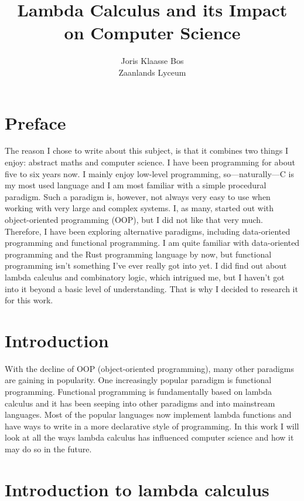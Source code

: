 \documentclass[11pt]{article}
\title{Lambda Calculus and its Impact on Computer Science}
\author{Joris Klaasse Bos\\ Zaanlands Lyceum}
\begin{document}
\maketitle
\newpage

\section*{Preface}


The reason I chose to write about this subject, is that it combines two things
I enjoy: abstract maths and computer science. I have been programming for about
five to six years now. I mainly enjoy low-level programming, so---naturally---C
is my most used language and I am most familiar with a simple procedural
paradigm. Such a paradigm is, however, not always very easy to use when working
with very large and complex systems. I, as many, started out with
object-oriented programming (OOP), but I did not like that very much.
Therefore, I have been exploring alternative paradigms, including data-oriented
programming and functional programming. I am quite familiar with data-oriented
programming and the Rust programming language by now, but functional
programming isn't something I've ever really got into yet. I did find out about
lambda calculus and combinatory logic, which intrigued me, but I haven’t got
into it beyond a basic level of understanding. That is why I decided to
research it for this work. 

\newpage

\tableofcontents
\newpage

\section{Introduction}

With the decline of OOP (object-oriented programming), many other paradigms are
gaining in popularity. One increasingly popular paradigm is functional
programming. Functional programming is fundamentally based on lambda calculus
and it has been seeping into other paradigms and into mainstream languages.
Most of the popular languages now implement lambda functions and have ways to
write in a more declarative style of programming. In this work I will look at
all the ways lambda calculus has influenced computer science and how it may do
so in the future.

\section{Introduction to lambda calculus}
\end{document}
